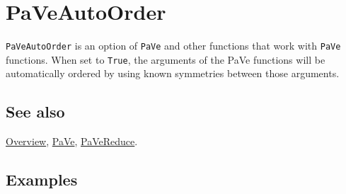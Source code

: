 \documentclass[../FeynCalcManual.tex]{subfiles}
\begin{document}
\hypertarget{paveautoorder}{%
\section{PaVeAutoOrder}\label{paveautoorder}}

\texttt{PaVeAutoOrder} is an option of \texttt{PaVe} and other functions
that work with \texttt{PaVe} functions. When set to \texttt{True}, the
arguments of the PaVe functions will be automatically ordered by using
known symmetries between those arguments.

\subsection{See also}

\hyperlink{toc}{Overview}, \hyperlink{pave}{PaVe},
\hyperlink{pavereduce}{PaVeReduce}.

\subsection{Examples}
\end{document}
